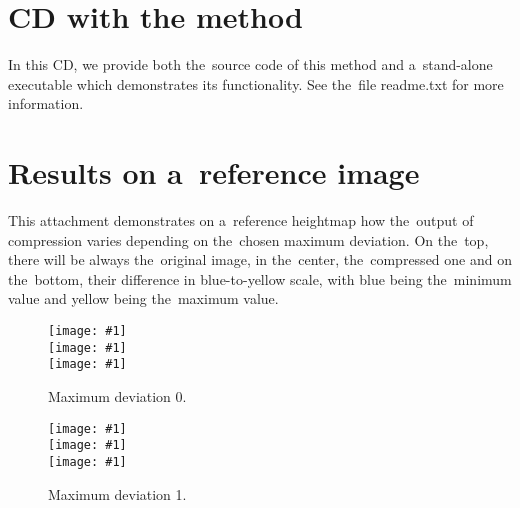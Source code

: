 \appendix

%
%
%
%
%

\openright

\chapter{CD with the method}
\label{att:cd}
In this CD, we provide both the~source code of this method and a~stand-alone executable which demonstrates its functionality. See the~file readme.txt for more information.


\chapter{Results on a~reference image}
\label{att:res_ref}

This attachment demonstrates on a~reference heightmap how the~output of compression varies depending on the~chosen maximum deviation. On the~top, there will be always the~original image, in the~center, the~compressed one and on the~bottom, their difference in blue-to-yellow scale, with blue being the~minimum value and yellow being the~maximum value.

\newcommand{\incref}[1]{\texttt{[image: \#1]}}

\begin{figure}
	\begin{center}
		\incref{figures/out_0.png} \\ 
		\incref{figures/out_0.png} \\ 
		\incref{figures/out_diff_0.png} \\ 
	\end{center}
	\caption{Maximum deviation 0.}
\end{figure}

\begin{figure}
	\begin{center}
		\incref{figures/out_1.png} \\ 
		\incref{figures/out_1.png} \\ 
		\incref{figures/out_diff_1.png} \\ 
	\end{center}
	\caption{Maximum deviation 1.}
\end{figure}


